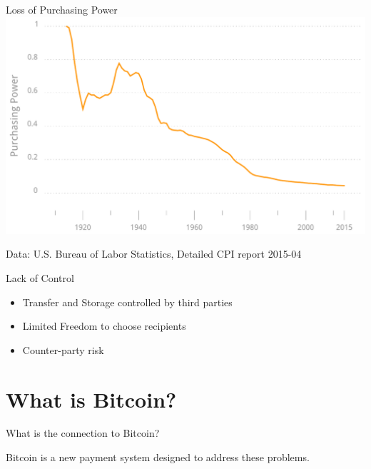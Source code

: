 \documentclass[12pt, usepdftitle=false]{beamer}
\begin{document}
\begin{frame}{Loss of Purchasing Power}
\includegraphics[width=\textwidth]{cpi.pdf}
	\begin{flushright}
	\tiny{Data: U.S. Bureau of Labor Statistics, Detailed CPI report 2015-04}
	\end{flushright}
\end{frame}


\begin{frame}{Lack of Control}
	\begin{itemize}
		\item Transfer and Storage controlled by third parties
		\item Limited Freedom to choose recipients
		\item Counter-party risk
	\end{itemize}
\end{frame}


\section{What is Bitcoin?}
\frame{\tableofcontents[currentsection]}


\begin{frame}{What is the connection to Bitcoin?}

	Bitcoin is a new payment system designed to address these problems.
	
\end{frame}
\end{document}
